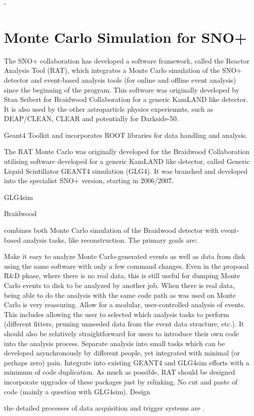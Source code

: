 -

\section{Monte Carlo Simulation for SNO+}
The SNO+ collaboration has developed a software framework, called the Reactor Analysis
Tool (RAT), which integrates a Monte Carlo simulation of the SNO+ detector and event-based analysis tools (for online and offline event analysis) since the beginning of the program. This software was originally developed by Stan Seibert for Braidwood Collaboration for a generic KamLAND like detector. It is also used by the other astroparticle physics experiemnts, such as DEAP/CLEAN, CLEAR and potentially for Darkside-50.







Geant4 Toolkit and
incorporates ROOT libraries for data handling and analysis.



The RAT Monte Carlo was originally developed for the Braidwood Collaboration
utilising software developed for a generic KamLAND like detector, called Generic Liquid Scintillator GEANT4 simulation (GLG4). It was branched and
developed into the specialist SNO+ version, starting in 2006/2007.

GLG4sim


Braidwood






 combines both Monte Carlo simulation of the Braidwood detector with event-based analysis tasks, like reconstruction. The primary goals are:

Make it easy to analyze Monte Carlo-generated events as well as data from disk using the same software with only a few command changes. Even in the proposal R\&D phase, where there is no real data, this is still useful for dumping Monte Carlo events to disk to be analyzed by another job. When there is real data, being able to do the analysis with the same code path as was used on Monte Carlo is very reassuring.
Allow for a modular, user-controlled analysis of events. This includes allowing the user to selected which analysis tasks to perform (different fitters, pruning unneeded data from the event data structure, etc.). It should also be relatively straightforward for users to introduce their own code into the analysis process.
Separate analysis into small tasks which can be developed asynchronously by different people, yet integrated with minimal (or perhaps zero) pain.
Integrate into existing GEANT4 and GLG4sim efforts with a minimum of code duplication. As much as possible, RAT should be designed incorporate upgrades of these packages just by relinking. No cut and paste of code (mainly a question with GLG4sim).
Design


the detailed processes of data acquisition and trigger systems are \cite{whitepaper}.


\cite{ratManual}





